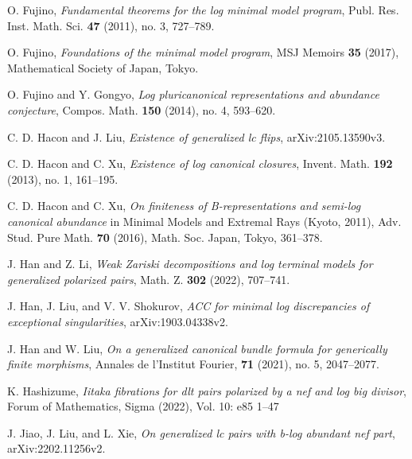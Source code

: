\documentclass[11pt]{amsart}
\numberwithin{equation}{section}
\theoremstyle{definition}
\theoremstyle{definition}
\theoremstyle{definition}
\begin{document}
\begin{thebibliography}{ABCDE}
 O. Fujino, \textit{Fundamental theorems for the log minimal model program}, Publ. Res. Inst. Math. Sci. \textbf{47} (2011), no. 3, 727--789.

 O. Fujino, \textit{Foundations of the minimal model program}, MSJ Memoirs \textbf{35} (2017), Mathematical Society of Japan, Tokyo.


 O. Fujino and Y. Gongyo, \textit{Log pluricanonical representations and abundance conjecture}, Compos. Math. \textbf{150} (2014), no. 4, 593--620.

 C. D. Hacon and J. Liu, \textit{Existence of generalized lc flips}, arXiv:2105.13590v3.

 C. D. Hacon and C. Xu, \textit{Existence of log canonical closures}, Invent. Math. \textbf{192} (2013), no. 1, 161--195.

 C. D. Hacon and C. Xu, \textit{On finiteness of B-representations and semi-log canonical abundance} in Minimal Models and Extremal Rays (Kyoto, 2011), Adv. Stud. Pure Math. \textbf{70} (2016), Math. Soc. Japan, Tokyo, 361--378. 

 J. Han and Z. Li, \textit{Weak Zariski decompositions and log terminal models for generalized polarized pairs}, Math. Z. \textbf{302} (2022), 707--741.

 J. Han, J. Liu, and V. V. Shokurov, \textit{ACC for minimal log discrepancies of exceptional singularities}, arXiv:1903.04338v2.

 J. Han and W. Liu, \textit{On a generalized canonical bundle formula for generically finite morphisms}, Annales de l'Institut Fourier, \textbf{71} (2021), no. 5, 2047--2077.

 K. Hashizume, \textit{Iitaka fibrations for dlt pairs polarized by a nef and log big divisor}, Forum of Mathematics, Sigma (2022), Vol. 10: e85 1–47


 J. Jiao, J. Liu, and L. Xie, \textit{On generalized lc pairs with b-log abundant nef part}, arXiv:2202.11256v2.


\end{thebibliography}
\end{document}
